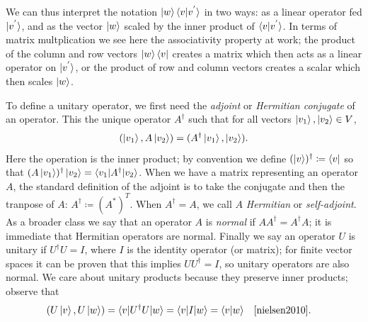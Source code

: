 \documentclass[12pt,twoside]{reedthesis}
\theoremstyle{plain}   %
\theoremstyle{definition}
\theoremstyle{remark}
\numberwithin{equation}{section}
\begin{document}
  We can thus interpret the notation $\ket{w} \braket{v|v^{'}}$ in two ways: as a linear operator fed $\ket{v^{'}}$, and as the vector $\ket{w}$ scaled by the inner product of $\braket{v|v^{'}}$.
  In terms of matrix multplication we see here the associativity property at work; the product of the column and row vectors $\ket{w} \bra{v}$ creates a matrix which then acts as a linear operator on
  $\ket{v^{'}}$, or the product of row and column vectors creates a scalar which then scales $\ket{w}$.
  \par
  To define a unitary operator, we first need the \emph{adjoint} or \emph{Hermitian conjugate} \cite[2.1.6]{nielsen2010} of an operator.
  This the unique operator $A^\dag$ such that for all vectors $\ket{v_1}, \ket{v_2} \in V$,
  \[(\ket{v_1}, A \ket{v_2}) = ( A^\dag \ket{v_1}, \ket{v_2} ).\]
  Here the operation is the inner product; by convention we define $(\ket{v})^\dag \coloneq \bra{v}$ so that $(A \ket{v_1})^\dag \ket{v_2} = \braket{v_1 | A^\dag |v_2 }$.
  When we have a matrix representing an operator $A$, the standard definition of the adjoint is to take the conjugate and then the tranpose of $A$: $A^\dag \coloneq (A^*)^T$.
  When $A^\dag = A$, we call $A$ \emph{Hermitian} or \emph{self-adjoint}.
  As a broader class we say that an operator $A$ is \emph{normal} if $AA^\dag = A^\dag A$; it is immediate that Hermitian operators are normal.
  Finally we say an operator $U$ is unitary if $U^\dag U = I$, where $I$ is the identity operator (or matrix); for finite vector spaces it can be proven that this implies $ U U^\dag = I$, so unitary
  operators are also normal.
  We care about unitary products because they preserve inner products; observe that
  \begin{align*}
    & (U \ket{v}, U \ket{w}) = \braket{v | U^\dag U  | w} = \braket{v | I | w} = \braket{v | w}  & & \text{\cite[2.36]{nielsen2010}.}
  \end{align*}
\end{document}
